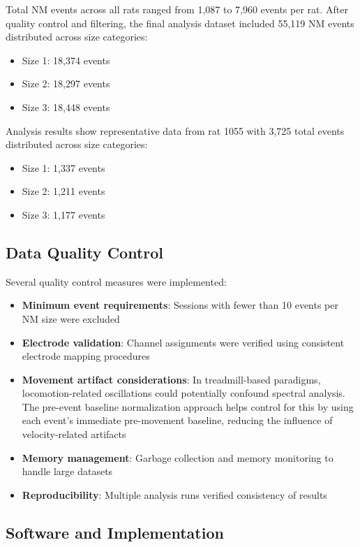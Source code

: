 \documentclass[11pt]{article}
\begin{document}
Total NM events across all rats ranged from 1,087 to 7,960 events per rat. After quality control and filtering, the final analysis dataset included 55,119 NM events distributed across size categories:
\begin{itemize}
\item Size 1: 18,374 events
\item Size 2: 18,297 events
\item Size 3: 18,448 events
\end{itemize}

Analysis results show representative data from rat 1055 with 3,725 total events distributed across size categories:
\begin{itemize}
\item Size 1: 1,337 events
\item Size 2: 1,211 events
\item Size 3: 1,177 events
\end{itemize}

\subsection{Data Quality Control}

Several quality control measures were implemented:

\begin{itemize}
\item \textbf{Minimum event requirements}: Sessions with fewer than 10 events per NM size were excluded
\item \textbf{Electrode validation}: Channel assignments were verified using consistent electrode mapping procedures
\item \textbf{Movement artifact considerations}: In treadmill-based paradigms, locomotion-related oscillations could potentially confound spectral analysis. The pre-event baseline normalization approach helps control for this by using each event's immediate pre-movement baseline, reducing the influence of velocity-related artifacts
\item \textbf{Memory management}: Garbage collection and memory monitoring to handle large datasets
\item \textbf{Reproducibility}: Multiple analysis runs verified consistency of results
\end{itemize}

\subsection{Software and Implementation}
\end{document}
